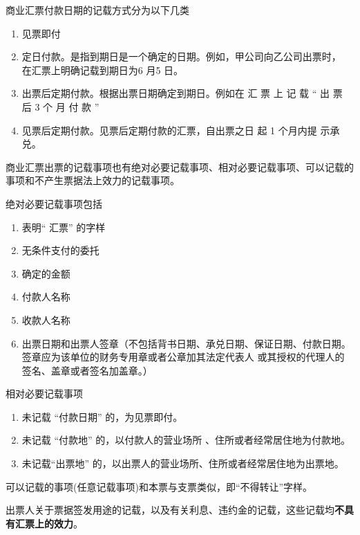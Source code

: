 \documentclass[UTF8,12pt]{ctexart}
\numberwithin{equation}{section} %
\numberwithin{figure}{section}
\numberwithin{table}{section}
\begin{document}
	商业汇票付款日期的记载方式分为以下几类
	\begin{enumerate}
		\item 见票即付
		
		\item 定日付款。是指到期日是一个确定的日期。例如，甲公司向乙公司出票时， 在汇票上明确记载到期日为6 月5 日。
		
		\item 出票后定期付款。根据出票日期确定到期日。例如在 汇 票 上 记 载 “ 出 票 后 3 个 月 付 款 ”
		
		\item 见票后定期付款。见票后定期付款的汇票，自出票之日 起 1 个月内提 示承兑。
	\end{enumerate}

	
	商业汇票出票的记载事项也有绝对必要记载事项、相对必要记载事项、可以记载的事项和不产生票据法上效力的记载事项。
	
	绝对必要记载事项包括
	\begin{enumerate}
		\item 表明“ 汇票” 的字样
		
		\item 无条件支付的委托
		
		\item 确定的金额
		
		\item 付款人名称
		
		\item 收款人名称
		
		\item 出票日期和出票人签章（不包括背书日期、承兑日期、保证日期、付款日期。签章应为该单位的财务专用章或者公章加其法定代表人 或其授权的代理人的签名、盖章或者签名加盖章。）
	\end{enumerate}


	相对必要记载事项
	\begin{enumerate}
		\item 未记载 “付款日期” 的，为见票即付。
		
		\item 未记载 “付款地” 的，以付款人的营业场所 、住所或者经常居住地为付款地。 
		
		\item 未记载“出票地” 的，以出票人的营业场所、住所或者经常居住地为出票地。
	\end{enumerate}

	
	可以记载的事项(任意记载事项)和本票与支票类似，即“不得转让”字样。
	
	出票人关于票据签发用途的记载，以及有关利息、违约金的记载，这些记载均\textbf{不具有汇票上的效力}。
	
\end{document}
